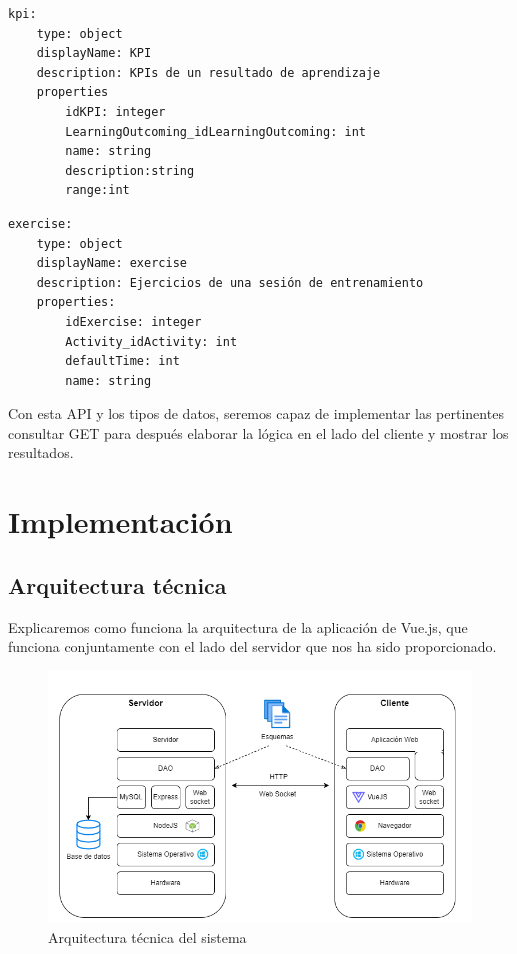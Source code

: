 \begin{lstlisting}[style=Consola, caption={Tipo dato kpi},label=Consola_code_kpi]
kpi:
	type: object
 	displayName: KPI
 	description: KPIs de un resultado de aprendizaje
 	properties
 		idKPI: integer
 		LearningOutcoming_idLearningOutcoming: int
 		name: string
 		description:string
 		range:int
\end{lstlisting}
\begin{lstlisting}[style=Consola, caption={Tipo dato exercise},label=Consola_code_exercise]
exercise: 
    type: object 
    displayName: exercise 
    description: Ejercicios de una sesión de entrenamiento 
    properties: 
      	idExercise: integer 
      	Activity_idActivity: int 
      	defaultTime: int 
      	name: string
\end{lstlisting}

Con esta API y los tipos de datos, seremos capaz de implementar las pertinentes consultar GET para después elaborar la lógica en el lado del cliente y mostrar los resultados.
\section{Implementación}
\subsection{Arquitectura técnica}
Explicaremos como funciona la arquitectura de la aplicación de Vue.js, que funciona conjuntamente con el lado del servidor que nos ha sido proporcionado.

\begin{figure}[H]
    \centering
    \includegraphics[width=15cm]{archivos/tfg_jorge/arquitectura_tecnica}
    \caption{Arquitectura técnica del sistema}\label{sistemass2}
\end{figure}

